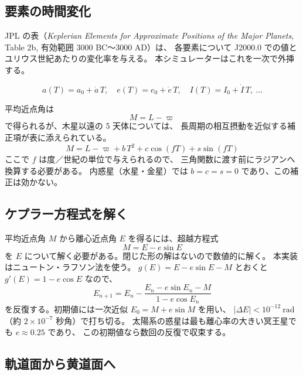 \documentclass[a4paper,11pt]{ltjsarticle}
\begin{document}
\subsection{要素の時間変化}

JPL の表（\emph{Keplerian Elements for Approximate Positions of the Major
Planets}, Table 2b, 有効範囲 3000 BC〜3000 AD）は、
各要素について J2000.0 での値とユリウス世紀あたりの変化率を与える。
本シミュレーターはこれを一次で外挿する。

\begin{equation}
  a(T) = a_0 + \dot{a}\,T,\quad
  e(T) = e_0 + \dot{e}\,T,\quad
  I(T) = I_0 + \dot{I}\,T,\ \dots
\end{equation}

平均近点角は
\begin{equation}
  M = L - \varpi
\end{equation}
で得られるが、木星以遠の 5 天体については、
長周期の相互摂動を近似する補正項が表に添えられている。
\begin{equation}
  M = L - \varpi + b\,T^2 + c\cos(f T) + s\sin(f T)
  \label{eq:outer}
\end{equation}
ここで $f$ は度／世紀の単位で与えられるので、
三角関数に渡す前にラジアンへ換算する必要がある。
内惑星（水星・金星）では $b=c=s=0$ であり、この補正は効かない。

\subsection{ケプラー方程式を解く}

平均近点角 $M$ から離心近点角 $E$ を得るには、超越方程式
\begin{equation}
  M = E - e\sin E
  \label{eq:kepler}
\end{equation}
を $E$ について解く必要がある。閉じた形の解はないので数値的に解く。
本実装はニュートン・ラフソン法を使う。
$g(E) = E - e\sin E - M$ とおくと $g'(E) = 1 - e\cos E$ なので、
\begin{equation}
  E_{n+1} = E_n - \frac{E_n - e\sin E_n - M}{1 - e\cos E_n}
\end{equation}
を反復する。初期値には一次近似 $E_0 = M + e\sin M$ を用い、
$|\Delta E| < 10^{-12}\ \text{rad}$（約 $2\times10^{-7}$ 秒角）で打ち切る。
太陽系の惑星は最も離心率の大きい冥王星でも $e \approx 0.25$ であり、
この初期値なら数回の反復で収束する。

\subsection{軌道面から黄道面へ}
\end{document}
